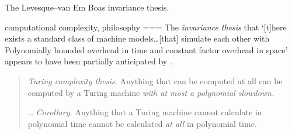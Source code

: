 The Levesque–van Em Boas invariance thesis.

computational complexity, philosophy
===
The \emph{invariance thesis} \parencites[see][\S~1.3.1]{arora2009}[\S~2.2]{dean2021}[\S~1]{vanemdeboas1991}[\S~3]{levesque1988} that ‘[t]here exists a standard class of machine models…[that] simulate each other with Polynomially bounded overhead in time and constant factor overhead in space’ appears to have been partially anticipated by \textcite[\S~3]{levesque1988}.
\begin{quote}
	\emph{Turing complexity thesis.} Anything that can be computed at all can be computed by a Turing machine \emph{with at most a polynomial slowdown.}
	
	\ldots{} \emph{Corollary.} Anything that a Turing machine cannot calculate in polynomial time cannot be calculated \emph{at all} in polynomial time.
\end{quote}